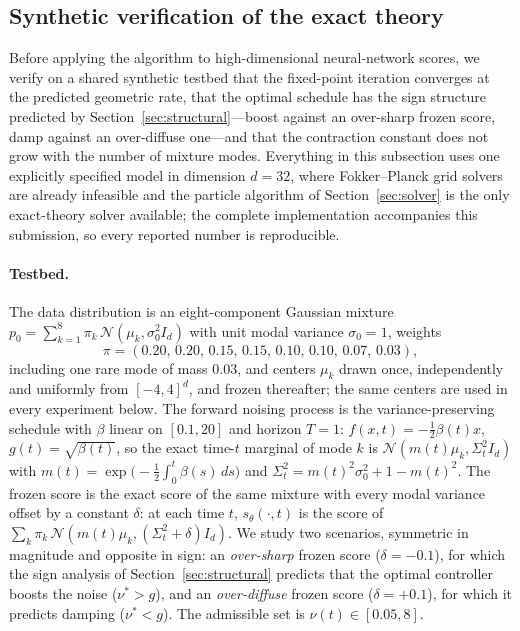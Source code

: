     \subsection{Synthetic verification of the exact theory}\label{sec:synthetic}

    Before applying the algorithm to high-dimensional neural-network scores, we verify on a shared synthetic testbed that the fixed-point iteration converges at the predicted geometric rate, that the optimal schedule has the sign structure predicted by Section~\ref{sec:structural}---boost against an over-sharp frozen score, damp against an over-diffuse one---and that the contraction constant does not grow with the number of mixture modes. Everything in this subsection uses one explicitly specified model in dimension $d=32$, where Fokker--Planck grid solvers are already infeasible and the particle algorithm of Section~\ref{sec:solver} is the only exact-theory solver available; the complete implementation accompanies this submission, so every reported number is reproducible.

    \paragraph{Testbed.} The data distribution is an eight-component Gaussian mixture $p_0=\sum_{k=1}^{8}\pi_k\,\mathcal N(\mu_k,\sigma_0^2 I_d)$ with unit modal variance $\sigma_0=1$, weights
    \begin{equation*}
        \pi=(0.20,\,0.20,\,0.15,\,0.15,\,0.10,\,0.10,\,0.07,\,0.03),
    \end{equation*}
    including one rare mode of mass $0.03$, and centers $\mu_k$ drawn once, independently and uniformly from $[-4,4]^d$, and frozen thereafter; the same centers are used in every experiment below. The forward noising process is the variance-preserving schedule with $\beta$ linear on $[0.1,20]$ and horizon $T=1$: $f(x,t)=-\tfrac12\beta(t)x$, $g(t)=\sqrt{\beta(t)}$, so the exact time-$t$ marginal of mode $k$ is $\mathcal N(m(t)\mu_k,\Sigma_t^2 I_d)$ with $m(t)=\exp\bigl(-\tfrac12\int_0^t\beta(s)\,ds\bigr)$ and $\Sigma_t^2=m(t)^2\sigma_0^2+1-m(t)^2$. The frozen score is the exact score of the same mixture with every modal variance offset by a constant $\delta$: at each time $t$, $s_\theta(\cdot,t)$ is the score of $\sum_k\pi_k\,\mathcal N(m(t)\mu_k,(\Sigma_t^2+\delta)I_d)$. We study two scenarios, symmetric in magnitude and opposite in sign: an \emph{over-sharp} frozen score ($\delta=-0.1$), for which the sign analysis of Section~\ref{sec:structural} predicts that the optimal controller boosts the noise ($\nu^*>g$), and an \emph{over-diffuse} frozen score ($\delta=+0.1$), for which it predicts damping ($\nu^*<g$). The admissible set is $\nu(t)\in[0.05,8]$.

